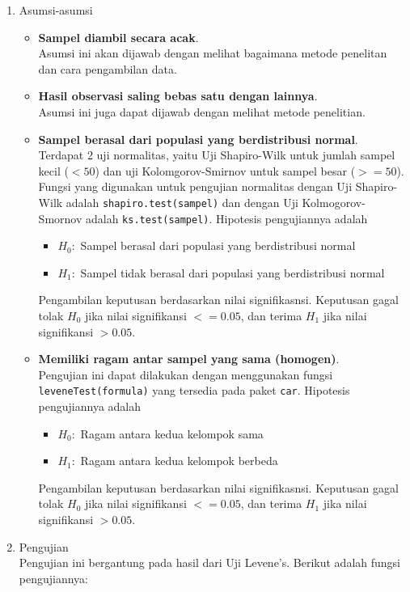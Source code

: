 \documentclass[
]{book}
\providecommand{\tightlist}{%
  \setlength{\itemsep}{0pt}\setlength{\parskip}{0pt}}
\begin{document}
\begin{enumerate}
\def\labelenumi{\arabic{enumi}.}
\tightlist
\item
  Asumsi-asumsi

  \begin{itemize}
  \item
    \textbf{Sampel diambil secara acak}.\\
    Asumsi ini akan dijawab dengan melihat bagaimana metode penelitan dan cara pengambilan data.
  \item
    \textbf{Hasil observasi saling bebas satu dengan lainnya}.\\
    Asumsi ini juga dapat dijawab dengan melihat metode penelitian.
  \item
    \textbf{Sampel berasal dari populasi yang berdistribusi normal}.\\
    Terdapat 2 uji normalitas, yaitu Uji Shapiro-Wilk untuk jumlah sampel kecil (\(< 50\)) dan uji Kolomgorov-Smirnov untuk sampel besar (\(>= 50\)). Fungsi yang digunakan untuk pengujian normalitas dengan Uji Shapiro-Wilk adalah \texttt{shapiro.test(sampel)} dan dengan Uji Kolmogorov-Smornov adalah \texttt{ks.test(sampel)}. Hipotesis pengujiannya adalah

    \begin{itemize}
    \tightlist
    \item
      \(H_0 :\) Sampel berasal dari populasi yang berdistribusi normal
    \item
      \(H_1 :\) Sampel tidak berasal dari populasi yang berdistribusi normal
    \end{itemize}

    Pengambilan keputusan berdasarkan nilai signifikasnsi. Keputusan gagal tolak \(H_0\) jika nilai signifikansi \(<= 0.05\), dan terima \(H_1\) jika nilai signifikansi \(> 0.05\).
  \item
    \textbf{Memiliki ragam antar sampel yang sama (homogen)}.\\
    Pengujian ini dapat dilakukan dengan menggunakan fungsi \texttt{leveneTest(formula)} yang tersedia pada paket \texttt{car}. Hipotesis pengujiannya adalah

    \begin{itemize}
    \tightlist
    \item
      \(H_0 :\) Ragam antara kedua kelompok sama
    \item
      \(H_1 :\) Ragam antara kedua kelompok berbeda
    \end{itemize}

    Pengambilan keputusan berdasarkan nilai signifikasnsi. Keputusan gagal tolak \(H_0\) jika nilai signifikansi \(<= 0.05\), dan terima \(H_1\) jika nilai signifikansi \(> 0.05\).
  \end{itemize}
\item
  Pengujian\\
  Pengujian ini bergantung pada hasil dari Uji Levene's. Berikut adalah fungsi pengujiannya:


\end{enumerate}
\end{document}
